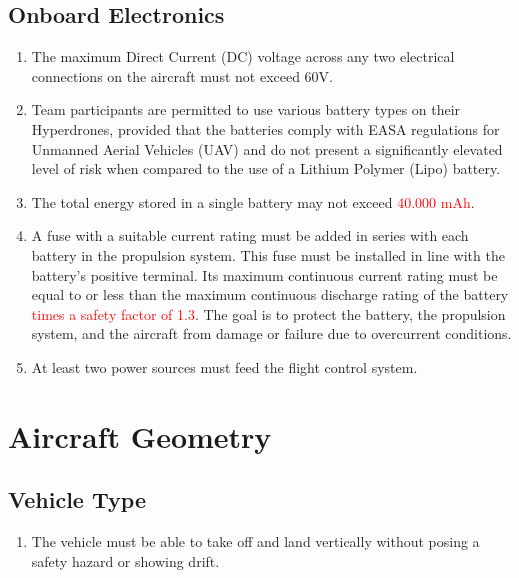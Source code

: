 \documentclass{article}
\begin{document}
\subsection{Onboard Electronics}
\begin{enumerate}
  \item The maximum Direct Current (DC) voltage across any two electrical connections on the aircraft must not exceed 60V.
  \item Team participants are permitted to use various battery types on their Hyperdrones, provided that the batteries comply with EASA regulations for Unmanned Aerial Vehicles (UAV) and do not present a significantly elevated level of risk when compared to the use of a Lithium Polymer (Lipo) battery. 
  \item The total energy stored in a single battery may not exceed \textcolor{red}{40.000 mAh}.
  \item A fuse with a suitable current rating must be added in series with each battery in the propulsion system. 
  This fuse must be installed in line with the battery's positive terminal. Its maximum continuous current rating must be equal to or less than the maximum continuous discharge rating of the battery \textcolor{red}{times a safety factor of 1.3}. The goal is to protect the battery, the propulsion system, and the aircraft from damage or failure due to overcurrent conditions.
  \item At least two power sources must feed the flight control system. 
\end{enumerate}



\section{Aircraft Geometry}

\subsection{Vehicle Type}
\begin{enumerate}
  \item The vehicle must be able to take off and land vertically without posing a safety hazard or showing drift.  
\end{enumerate}
\end{document}
